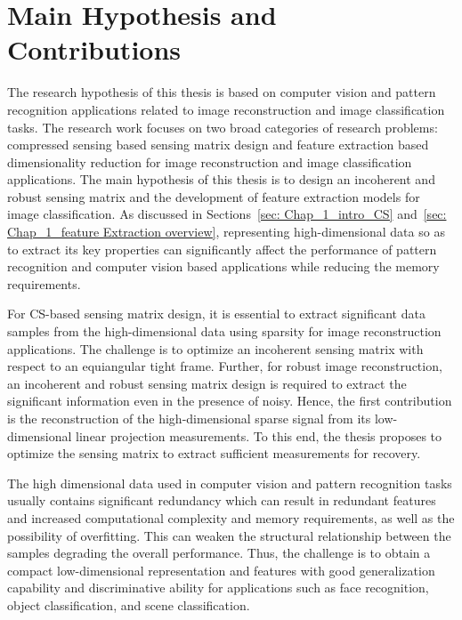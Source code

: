 \section{Main Hypothesis and Contributions}
\label{sec: chap1_hypothesis}
%
The research hypothesis of this thesis is based on computer vision and pattern recognition applications related to image reconstruction and image classification tasks. The research work focuses on two broad categories of research problems: compressed sensing based sensing matrix design and feature extraction based dimensionality reduction for image reconstruction and image classification applications. The main hypothesis of this thesis is to design an incoherent and robust sensing matrix and the development of feature extraction models for image classification. As discussed in Sections~\ref{sec: Chap_1_intro_CS} and~\ref{sec: Chap_1_feature Extraction overview}, representing high-dimensional data so as to extract its key properties can significantly affect the performance of pattern recognition and computer vision based applications while reducing the memory requirements.

For CS-based sensing matrix design, it is essential to extract significant data samples from the high-dimensional data using sparsity for image reconstruction applications. The challenge is to optimize an incoherent sensing matrix with respect to an equiangular tight frame. Further, for robust image reconstruction, an incoherent and robust sensing matrix design is required to extract the significant information even in the presence of noisy. Hence, the first contribution is the reconstruction of the high-dimensional sparse signal from its low-dimensional linear projection measurements. To this end, the thesis proposes to optimize the sensing matrix to extract sufficient measurements for recovery.

The high dimensional data used in computer vision and pattern recognition tasks usually contains significant redundancy which can result in redundant features and increased computational complexity and memory requirements, as well as the possibility of overfitting. This can weaken the structural relationship between the samples degrading the overall performance. Thus, the challenge is to obtain a compact low-dimensional representation and features with good generalization capability and discriminative ability for applications such as face recognition, object classification, and scene classification.

